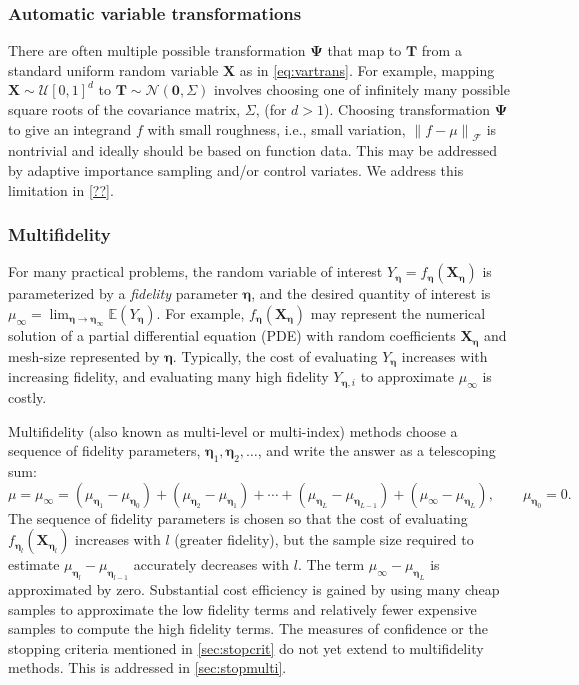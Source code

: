 \documentclass[11pt]{NSFamsart}
\newcommand{\fidparam}{\bldeta}
\newcommand{\bbE}{\mathbb{E}}
\newcommand{\mSigma}{\mathsf{\Sigma}}
\newcommand{\bzero}{\boldsymbol{0}}
\newcommand{\bT}{{\boldsymbol{T}}}
\newcommand{\bX}{{\boldsymbol{X}}}
\newcommand{\bPsi}{{\boldsymbol{\Psi}}}
\newcommand{\bldeta}{{\boldsymbol{\eta}}}
\newcommand{\calf}{{\mathcal{F}}}
\newcommand{\caln}{{\mathcal{N}}}
\newcommand{\calu}{{\mathcal{U}}}
\newcommand{\norm}[2][{}]{\ensuremath{\left \lVert #2 \right \rVert}_{#1}}
\begin{document}
\subsubsection{Automatic variable transformations}  There are often multiple possible transformation $\bPsi$ that map to $\bT$ from a standard uniform random variable $\bX$ as in \eqref{eq:vartrans}.  For example, mapping $\bX \sim \calu[0,1]^d$ to $\bT \sim \caln(\bzero,\mSigma)$  involves choosing one of infinitely many possible square roots of the covariance matrix, $\mSigma$, (for $d>1$).  Choosing transformation $\bPsi$ to give an integrand $f$ with small roughness, i.e., small variation, $\norm[\calf]{f - \mu}$ is nontrivial and ideally should be based on function data. This may be addressed by adaptive importance sampling and/or  control variates. We address this limitation in \cref{??}.

\subsubsection{Multifidelity} For many practical problems, the random variable of interest $Y_\fidparam = f_\fidparam(\bX_\fidparam)$ is parameterized by a \emph{fidelity} parameter $\fidparam$, and the desired quantity of interest is $\mu_\infty = \lim_{\fidparam \to \fidparam_\infty} \bbE(Y_\fidparam)$.  For example, $f_\fidparam(\bX_\fidparam)$ may represent the numerical solution of  a partial differential equation (PDE) with random coefficients $\bX_\fidparam$ and mesh-size represented by $\fidparam$.  Typically, the cost of evaluating $Y_\fidparam$ increases with increasing fidelity, and evaluating many high fidelity $Y_{\fidparam,i}$ to approximate $\mu_\infty$ is costly.

Multifidelity (also known as multi-level or multi-index) methods \cite{Hei01a, Gil15a, HajNobTem16a} choose a sequence of fidelity parameters, $\fidparam_1, \fidparam_2, \ldots$, and write the  answer as a telescoping sum: 
\[
\mu = \mu_\infty = (\mu_{\fidparam_1} - \mu_{\fidparam_0}) + (\mu_{\fidparam_2} - \mu_{\fidparam_1}) + \cdots +
(\mu_{\fidparam_L} - \mu_{\fidparam_{L-1}}) + (\mu_{\infty} - \mu_{\fidparam_{L}}), \qquad \mu_{\fidparam_0} = 0.
\]
The sequence of fidelity parameters is chosen so that the cost of evaluating $f_{\fidparam_l}(\bX_{\fidparam_l})$  increases with $l$ (greater fidelity), but  the sample size required to estimate $\mu_{\fidparam_l} - \mu_{\fidparam_{l-1}}$ accurately decreases with $l$. The term  $\mu_{\infty} - \mu_{\fidparam_{L}}$ is approximated by zero. Substantial cost efficiency is gained by using many cheap samples to approximate the low fidelity terms and relatively fewer expensive samples to compute the high fidelity terms.  The measures of confidence or the stopping criteria mentioned in  \cref{sec:stopcrit} do not yet extend to multifidelity methods.  This is addressed in  \cref{sec:stopmulti}.
\end{document}
